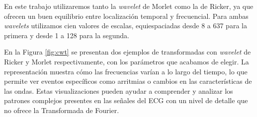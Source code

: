 En este trabajo utilizaremos tanto la \emph{wavelet} de Morlet como la de Ricker, ya que ofrecen un buen equilibrio entre localización temporal y frecuencial. Para ambas \emph{wavelets} utilizamos cien valores de escalas, equiespaciadas desde 8 a 637 para la primera y desde 1 a 128 para la segunda.

En la Figura \ref{fig:cwt} se presentan dos ejemplos de transformadas con \emph{wavelet} de Ricker y Morlet respectivamente, con los parámetros que acabamos de elegir. La representación muestra cómo las frecuencias varían a lo largo del tiempo, lo que permite ver eventos específicos como arritmias o cambios en las características de las ondas. Estas visualizaciones pueden ayudar a comprender y analizar los patrones complejos presentes en las señales del ECG con un nivel de detalle que no ofrece la Transformada de Fourier.

